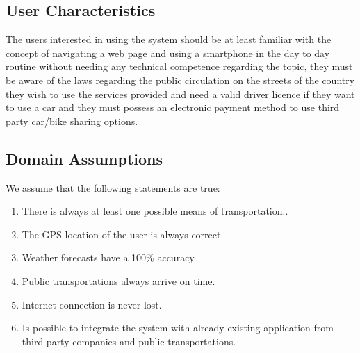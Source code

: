 \begin{samepage}
\subsection{User Characteristics}
The users interested in using the system should be at least familiar with the concept of navigating a web page and using a smartphone in the day to day routine without needing any technical competence regarding the topic, they must be aware of the laws regarding the public circulation on the streets of the country they wish to use the services provided and need a valid driver licence if they want to use a car and they must possess an electronic payment method to use third party car/bike sharing options.
\par
\subsection{Domain Assumptions}
We assume that the following statements are true:
\begin{enumerate}
\item There is always at least one possible means of transportation..
\item The GPS location of the user is always correct.
\item Weather forecasts have a 100\% accuracy.
\item Public transportations always arrive on time.
\item Internet connection is never lost.
\item Is possible to integrate the system with already existing application from third party companies and public transportations.
\end{enumerate}
\end{samepage}